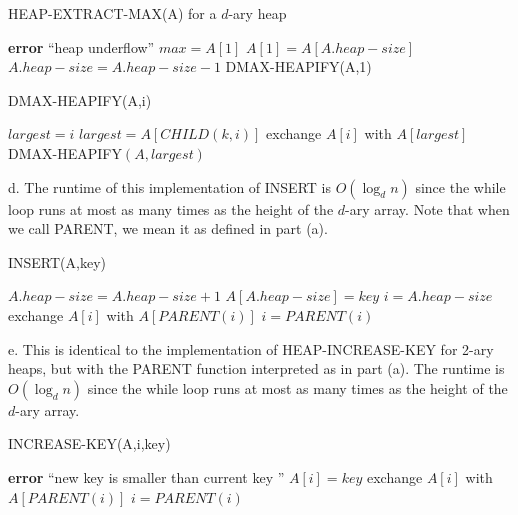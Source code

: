 \documentclass{article}
\begin{document}
\begin{algorithm}
\caption{HEAP-EXTRACT-MAX(A) for a $d$-ary heap}
\begin{algorithmic}[1]
	\State \textbf{error} ``heap underflow''
\EndIf
\State $max = A[1]$
\State $A[1] = A[A.heap-size]$
\State $A.heap-size = A.heap-size - 1$
\State DMAX-HEAPIFY(A,1)
\end{algorithmic}
\end{algorithm}

\begin{algorithm}
\caption{DMAX-HEAPIFY(A,i)}
\begin{algorithmic}[1]
\State $largest = i$
			\State $largest = A[CHILD(k,i)]$
		\EndIf
	\EndIf
\EndFor
{}
	\State exchange $A[i]$ with $A[largest]$
	\State DMAX-HEAPIFY$(A,largest)$
\EndIf
\end{algorithmic}
\end{algorithm}

d.  The runtime of this implementation of INSERT is $O(\log_d n)$ since the while loop runs at most as many times as the height of the $d$-ary array.  Note that when we call PARENT, we mean it as defined in part (a).\\

\begin{algorithm}
\caption{INSERT(A,key)}
\begin{algorithmic}[1]
\State $A.heap-size = A.heap-size + 1$
\State $A[A.heap-size] = key$
\State $i = A.heap-size$
\While{$i > 1$ and $A[PARENT(i) < A[i]$}
	\State exchange $A[i]$ with $A[PARENT(i)]$
	\State $i = PARENT(i)$
\EndWhile
\end{algorithmic}
\end{algorithm}

e. This is identical to the implementation of HEAP-INCREASE-KEY for 2-ary heaps, but with the PARENT function interpreted as in part (a).  The runtime is $O(\log_d n)$ since the while loop runs at most as many times as the height of the $d$-ary array.\\

\begin{algorithm}
\caption{INCREASE-KEY(A,i,key)}
\begin{algorithmic}[1]
	\State \textbf{error} ``new key is smaller than current key ''
\EndIf
\State $A[i] = key$
\While{$i > 1$ and $A[PARENT(i) < A[i]$}
	\State exchange $A[i]$ with $A[PARENT(i)]$
	\State $i = PARENT(i)$
\EndWhile
\end{algorithmic}
\end{algorithm}
\end{document}
